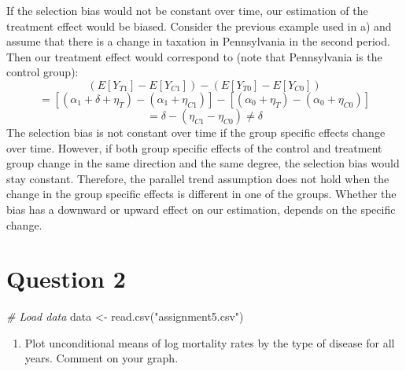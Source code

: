 \documentclass[
]{article}
\newenvironment{Shaded}{\begin{snugshade}}{\end{snugshade}}
\newcommand{\CommentTok}[1]{\textcolor[rgb]{0.56,0.35,0.01}{\textit{#1}}}
\newcommand{\FunctionTok}[1]{\textcolor[rgb]{0.00,0.00,0.00}{#1}}
\newcommand{\NormalTok}[1]{#1}
\newcommand{\OtherTok}[1]{\textcolor[rgb]{0.56,0.35,0.01}{#1}}
\newcommand{\StringTok}[1]{\textcolor[rgb]{0.31,0.60,0.02}{#1}}
\providecommand{\tightlist}{%
  \setlength{\itemsep}{0pt}\setlength{\parskip}{0pt}}
\begin{document}
If the selection bias would not be constant over time, our estimation of
the treatment effect would be biased. Consider the previous example used
in a) and assume that there is a change in taxation in Pennsylvania in
the second period. Then our treatment effect would correspond to (note
that Pennsylvania is the control group): \[
(E[Y_{T1}] - E[Y_{C1}]) - (E[Y_{T0}]-E[Y_{C0}])
\] \[
= [(\alpha_1 + \delta + \eta_T) - (\alpha_1 + \eta_{C1})] - [(\alpha_0 + \eta_T) - (\alpha_0 + \eta_{C0})]
\] \[
=\delta - (\eta_{C1} - \eta_{C0}) \neq \delta
\] The selection bias is not constant over time if the group specific
effects change over time. However, if both group specific effects of the
control and treatment group change in the same direction and the same
degree, the selection bias would stay constant. Therefore, the parallel
trend assumption does not hold when the change in the group specific
effects is different in one of the groups. Whether the bias has a
downward or upward effect on our estimation, depends on the specific
change.

\hypertarget{question-2}{%
\section{Question 2}\label{question-2}}

\begin{Shaded}
\begin{Highlighting}[]
\CommentTok{\# Load data}
\NormalTok{data }\OtherTok{\textless{}{-}} \FunctionTok{read.csv}\NormalTok{(}\StringTok{"assignment5.csv"}\NormalTok{)}
\end{Highlighting}
\end{Shaded}

\begin{enumerate}
\def\labelenumi{\roman{enumi})}
\tightlist
\item
  Plot unconditional means of log mortality rates by the type of disease
  for all years. Comment on your graph.
\end{enumerate}
\end{document}
